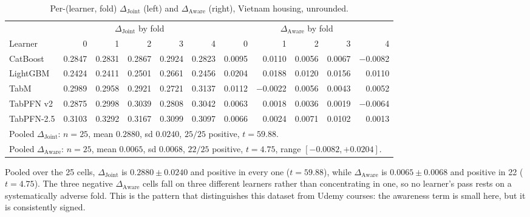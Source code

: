 \documentclass[10pt,letterpaper]{article}
\newcommand{\dj}{\Delta_{\mathrm{Joint}}}
\newcommand{\da}{\Delta_{\mathrm{Aware}}}
\begin{document}
\begin{table}[H]
\centering\small
\caption{Per-(learner, fold) $\dj$ (left) and $\da$ (right), Vietnam housing, unrounded.}
\begin{tabular}{lrrrrr@{\hskip 18pt}rrrrr}
\toprule
& \multicolumn{5}{c}{$\dj$ by fold} & \multicolumn{5}{c}{$\da$ by fold} \\
\cmidrule(r){2-6}\cmidrule(l){7-11}
Learner & 0 & 1 & 2 & 3 & 4 & 0 & 1 & 2 & 3 & 4 \\
\midrule
CatBoost   & 0.2847 & 0.2831 & 0.2867 & 0.2924 & 0.2823 & \phantom{-}0.0095 & \phantom{-}0.0110 & 0.0056 & 0.0067 & $-$0.0082 \\
LightGBM   & 0.2424 & 0.2411 & 0.2501 & 0.2661 & 0.2456 & 0.0204 & 0.0188 & 0.0120 & 0.0156 & 0.0110 \\
TabM       & 0.2989 & 0.2958 & 0.2921 & 0.2721 & 0.3137 & 0.0112 & $-$0.0022 & 0.0056 & 0.0043 & 0.0052 \\
TabPFN v2  & 0.2875 & 0.2998 & 0.3039 & 0.2808 & 0.3042 & 0.0063 & 0.0018 & 0.0036 & 0.0019 & $-$0.0064 \\
TabPFN-2.5 & 0.3103 & 0.3292 & 0.3167 & 0.3099 & 0.3097 & 0.0066 & 0.0024 & 0.0071 & 0.0102 & 0.0013 \\
\midrule
\multicolumn{11}{l}{Pooled $\dj$: $n{=}25$, mean $0.2880$, sd $0.0240$, $25/25$ positive, $t = 59.88$.} \\
\multicolumn{11}{l}{Pooled $\da$: $n{=}25$, mean $0.0065$, sd $0.0068$, $22/25$ positive, $t = 4.75$, range $[-0.0082, +0.0204]$.} \\
\bottomrule
\end{tabular}
\end{table}

\noindent Pooled over the 25 cells, $\dj$ is $0.2880 \pm 0.0240$ and positive in every one
($t = 59.88$), while $\da$ is $0.0065 \pm 0.0068$ and positive in 22 ($t = 4.75$). The three
negative $\da$ cells fall on three different learners rather than concentrating in one, so no
learner's pass rests on a systematically adverse fold. This is the pattern that distinguishes
this dataset from Udemy courses: the awareness term is small here, but it is consistently
signed.
\end{document}

